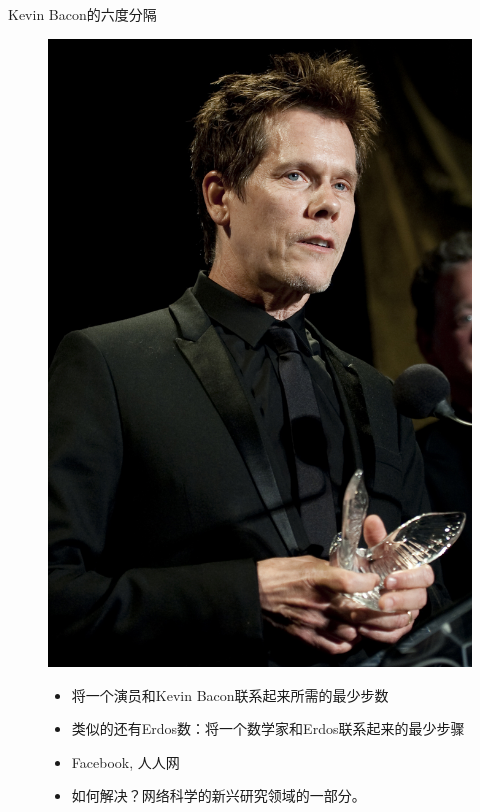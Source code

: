 \documentclass[UTF8]{ctexbeamer}
\begin{document}
\begin{frame}{Kevin Bacon的六度分隔}

  \begin{figure}
    \begin{minipage}{.2\linewidth}
      \includegraphics[width=\textwidth]{KevinBaconApr10.jpg}
    \end{minipage}%
    \begin{minipage}{.75\linewidth}
      \begin{itemize}
      \item 将一个演员和Kevin Bacon联系起来所需的最少步数
      \item 类似的还有Erdos数：将一个数学家和Erdos联系起来的最少步骤
      \item Facebook, 人人网
      \item 如何解决？网络科学的新兴研究领域的一部分。
      \end{itemize}
    \end{minipage}
  \end{figure}

\end{frame}
\end{document}
